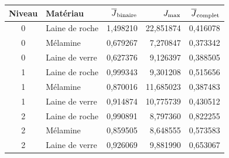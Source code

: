 \begin{tabular}{clrrr}
\toprule
Niveau & Matériau & $\overline J_{\rm binaire}$ & $J_{\rm max}$ & $\overline J_{\rm complet}$\\
\midrule
0 & Laine de roche & 1,498210 & 22,851874 & 0,416078\\
0 & Mélamine & 0,679267 & 7,270847 & 0,373342\\
0 & Laine de verre & 0,627376 & 9,126397 & 0,388505\\
1 & Laine de roche & 0,999343 & 9,301208 & 0,515656\\
1 & Mélamine & 0,870016 & 11,685023 & 0,387483\\
1 & Laine de verre & 0,914874 & 10,775739 & 0,430512\\
2 & Laine de roche & 0,990891 & 8,797360 & 0,822255\\
2 & Mélamine & 0,859505 & 8,648555 & 0,573583\\
2 & Laine de verre & 0,926069 & 9,881990 & 0,653067\\
\bottomrule
\end{tabular}
